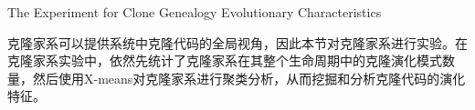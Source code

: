 
{The Experiment for Clone Genealogy Evolutionary Characteristics}

克隆家系可以提供系统中克隆代码的全局视角，因此本节对克隆家系进行实验。在克隆家系实验中，依然先统计了克隆家系在其整个生命周期中的克隆演化模式数量，然后使用X-means对克隆家系进行聚类分析，从而挖掘和分析克隆代码的演化特征。

